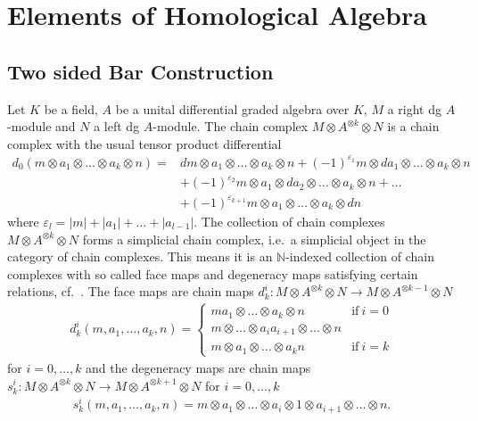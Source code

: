\documentclass{scrartcl}
\theoremstyle{plain}
\theoremstyle{definition}
\newcommand{\N}{\mathbb N}
\renewcommand{\epsilon}{\varepsilon}
\newcommand{\abs}[1]{\left\lvert#1\right\rvert}
\begin{document}
\section{Elements of Homological Algebra}

\subsection{Two sided Bar Construction}\label{subsec:bar_construction}
Let $K$ be a field, $A$ be a unital differential graded algebra over $K$, $M$ a right dg $A$-module and $N$ a left dg $A$-module. The chain complex $M\otimes A^{\otimes k}\otimes N$ is a chain complex with the usual tensor product differential 
\begin{align*}
    d_0(m\otimes a_1\otimes \dots\otimes  a_k\otimes  n) = &dm\otimes a_1\otimes \dots\otimes a_k\otimes n+(-1)^{\epsilon_1}m\otimes da_1\otimes \dots\otimes a_k\otimes n\\&+(-1)^{\epsilon_2}m\otimes a_1\otimes da_2\otimes \dots\otimes a_k\otimes n + \dots \\&+ (-1)^{\epsilon_{k+1}}m\otimes a_1\otimes \dots\otimes a_k\otimes dn
\end{align*}
where $\epsilon_l = \abs{m}+\abs{a_1}+\dots+\abs{a_{l-1}}$. The collection of chain complexes $M\otimes A^{\otimes k}\otimes N$ forms a simplicial chain complex, i.e.\ a simplicial object in the category of chain complexes. This means it is an $\N$-indexed collection of chain complexes with so called face maps and degeneracy maps satisfying certain relations, cf.~\cite[VII.5]{mac2013categories}. The face maps are chain maps $d^i_k\colon M\otimes A^{\otimes k}\otimes N\to M\otimes A^{\otimes {k-1}}\otimes N$ 
\begin{align*}
    d^i_k(m, a_1, \dots, a_k, n) = \begin{cases}ma_1\otimes\dots\otimes a_k\otimes n & \text{if}\ i=0\\
    m\otimes \dots\otimes a_ia_{i+1}\otimes \dots\otimes n\\
    m\otimes a_1\otimes\dots\otimes a_k n & \text{if}\ i=k
\end{cases}
\end{align*}
for $i=0,\dots, k$ and the degeneracy maps are chain maps $s^i_k\colon M\otimes A^{\otimes k}\otimes N\to M\otimes A^{\otimes {k+1}}\otimes N$ for $i=0, \dots, k$
\begin{align*}
    s^i_k(m, a_1,\dots, a_k, n) = m\otimes a_1\otimes\dots\otimes a_i\otimes 1\otimes a_{i+1}\otimes\dots\otimes n.
\end{align*}
\end{document}

